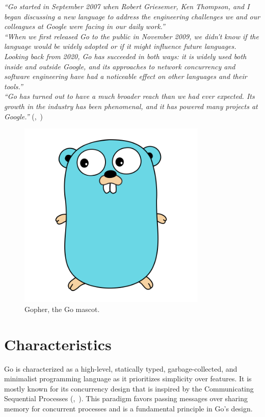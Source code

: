 \documentclass[
  digital,
  color,
  oneside,
  nosansbold,
  nocolorbold,
  lof,
  nolot,
]{fithesis4}
\def\citeauthoryear#1{(\textcite{#1},~\citeyear{#1})}
\begin{document}
\noindent
\textit{\enquote{Go started in September 2007 when Robert Griesemer, Ken Thompson, and I began discussing a new language to address the engineering challenges we and our colleagues at Google were facing in our daily work.}} \\

\noindent
\textit{\enquote{When we first released Go to the public in November 2009, we didn’t know if the language would be widely adopted or if it might influence future languages. Looking back from 2020, Go has succeeded in both ways: it is widely used both inside and outside Google, and its approaches to network concurrency and software engineering have had a noticeable effect on other languages and their tools.}} \\

\noindent
\textit{\enquote{Go has turned out to have a much broader reach than we had ever expected. Its growth in the industry has been phenomenal, and it has powered many projects at Google.}} \citeauthoryear{go-pike}

\begin{figure}[H]
    \centering
    \includegraphics[width=9cm]{figures/gopher.png}
    \caption{Gopher, the Go mascot.}
\end{figure}

\section{Characteristics}

Go is characterized as a high-level, statically typed, garbage-collected, and minimalist programming language as it prioritizes simplicity over features. It is mostly known for its concurrency design that is inspired by the Communicating Sequential Processes \citeauthoryear{csp}. This paradigm favors passing messages over sharing memory for concurrent processes and is a fundamental principle in Go's design.
\end{document}
